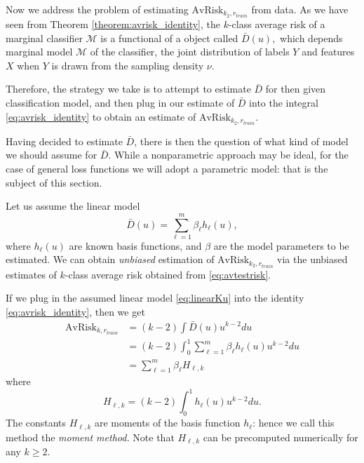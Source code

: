 \documentclass[12pt]{article}
\begin{document}
Now we address the problem of estimating $\text{AvRisk}_{k_2,
r_{train}}$ from data.  As we have seen from
Theorem \ref{theorem:avrisk_identity}, the $k$-class average risk of
a marginal classifier $\mathcal{M}$ is a functional of a object called
$\bar{D}(u),$ which depends marginal model $\mathcal{M}$ of the
classifier, the joint distribution of labels $Y$ and features $X$ when
$Y$ is drawn from the sampling density $\nu$.

Therefore, the strategy we take is to attempt to estimate $\bar{D}$
for then given classification model, and then plug in our estimate of
$\bar{D}$ into the integral \eqref{eq:avrisk_identity} to obtain an
estimate of $\text{AvRisk}_{k_2, r_{train}}$.

Having decided to estimate $\bar{D}$, there is then the question of
what kind of model we should assume for $\bar{D}$.  While a
nonparametric approach may be ideal, for the case of general loss
functions we will adopt a parametric model: that is the subject of
this section.

Let us assume the linear model
\begin{equation}\label{eq:linearKu}
\bar{D}(u) = \sum_{\ell = 1}^m \beta_\ell h_\ell(u),
\end{equation}
where $h_\ell(u)$ are known basis functions, and $\beta$ are the model
parameters to be estimated. We can obtain \emph{unbiased} estimation
of $\text{AvRisk}_{k_2, r_{train}}$
via the unbiased estimates of $k$-class average risk obtained from \eqref{eq:avtestrisk}.

If we plug in the assumed linear model \eqref{eq:linearKu} into the
identity \eqref{eq:avrisk_identity}, then we get
\begin{align}
\text{AvRisk}_{k, r_{train}} &= (k-2)\int \bar{D}(u) u^{k-2} du
\\&= (k-2)\int_0^1 \sum_{\ell = 1}^m \beta_\ell h_\ell(u) u^{k-2} du
\\&= \sum_{\ell = 1}^m \beta_\ell H_{\ell,k} \label{eq:avrisk_linear}
\end{align}
where
\begin{equation}
H_{\ell,k} = (k-2) \int_0^1 h_\ell(u) u^{k-2} du.
\end{equation}
The constants $H_{\ell, k}$ are moments of the basis function
$h_\ell$: hence we call this method the \emph{moment method.}  Note
that $H_{\ell, k}$ can be precomputed numerically for any $k \geq 2$.
\end{document}

